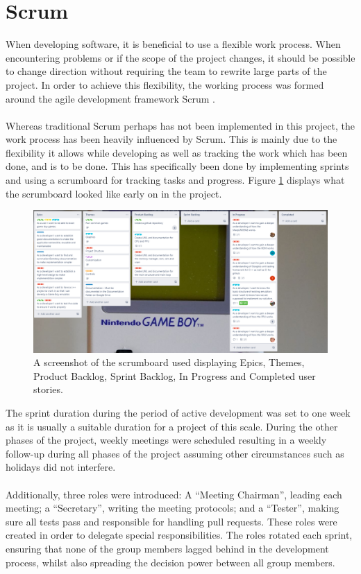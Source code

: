 \section{Scrum}
When developing software, it is beneficial to use a flexible work process. When encountering problems or if the scope of the project changes, it should be possible to change direction without requiring the team to rewrite large parts of the project. In order to achieve this flexibility, the working process was formed around the agile development framework Scrum \cite{Scrum}.
\\\\
Whereas traditional Scrum perhaps has not been implemented in this project, the work process has been heavily influenced by Scrum. This is mainly due to the flexibility it allows while developing as well as tracking the work which has been done, and is to be done. This has specifically been done by implementing sprints and using a scrumboard for tracking tasks and progress. Figure \ref{fig:scrumboard} displays what the scrumboard looked like early on in the project.

\begin{figure}[H]
    \centering
    \includegraphics[width=\textwidth]{figures/Scrumboard.PNG}
    \caption{A screenshot of the scrumboard used displaying Epics, Themes, Product Backlog, Sprint Backlog, In Progress and Completed user stories.}
    \label{fig:scrumboard}
\end{figure}

The sprint duration during the period of active development was set to one week as it is usually a suitable duration for a project of this scale. During the other phases of the project, weekly meetings were scheduled resulting in a weekly follow-up during all phases of the project assuming other circumstances such as holidays did not interfere.
\\\\
Additionally, three roles were introduced: A ``Meeting Chairman'', leading each meeting; a ``Secretary'', writing the meeting protocols; and a ``Tester'', making sure all tests pass and responsible for handling pull requests. These roles were created in order to delegate special responsibilities. The roles rotated each sprint, ensuring that none of the group members lagged behind in the development process, whilst also spreading the decision power between all group members. 


